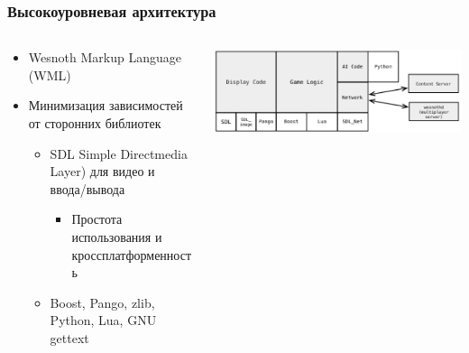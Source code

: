 \documentclass{../../slides-style}
\begin{document}
	\begin{frame}
		\frametitle{Высокоуровневая архитектура}
		\begin{columns}
			\begin{column}{0.6\textwidth}
				\begin{itemize}
					\item Wesnoth Markup Language (WML)
					\item Минимизация зависимостей от сторонних библиотек
					\begin{itemize}
						\item SDL Simple Directmedia Layer) для видео и ввода/вывода
						\begin{itemize}
							\item Простота использования и кроссплатформенность
						\end{itemize}
						\item Boost, Pango, zlib, Python, Lua, GNU gettext
					\end{itemize}
				\end{itemize}
			\end{column}
			\begin{column}{0.4\textwidth}
				\includegraphics[width=\textwidth]{wesnothArchitecture.png}
			\end{column}
		\end{columns}
	\end{frame}
\end{document}
